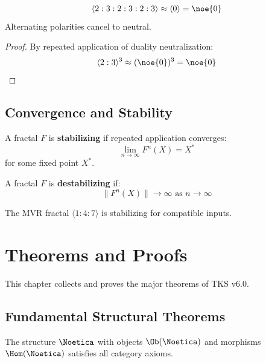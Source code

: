 \begin{theorem}
\label{thm:polarity-collapse}
\[
\langle 2 : 3 : 2 : 3 : 2 : 3 \rangle \approx \langle 0 \rangle = \noe{0}
\]
Alternating polarities cancel to neutral.
\end{theorem}

\begin{proof}
By repeated application of duality neutralization:
\[
\langle 2 : 3 \rangle^3 \approx (\noe{0})^3 = \noe{0}
\]
\end{proof}

\section{Convergence and Stability}

\begin{definition}
\label{def:stab-fractal}
A fractal $F$ is \textbf{stabilizing} if repeated application converges:
\[
\lim_{n \to \infty} F^n(X) = X^*
\]
for some fixed point $X^*$.
\end{definition}

\begin{definition}
\label{def:destab-fractal}
A fractal $F$ is \textbf{destabilizing} if:
\[
\|F^n(X)\| \to \infty \text{ as } n \to \infty
\]
\end{definition}

\begin{theorem}
\label{thm:mvr-stab}
The MVR fractal $\langle 1 : 4 : 7 \rangle$ is stabilizing for compatible inputs.
\end{theorem}

\chapter{Theorems and Proofs}
\label{ch:theorems}

This chapter collects and proves the major theorems of TKS v6.0.

\section{Fundamental Structural Theorems}

\begin{theorem}
\label{thm:noetica-cat-formal}
The structure $\Noetica$ with objects $\Ob(\Noetica)$ and morphisms $\Hom(\Noetica)$ satisfies all category axioms.
\end{theorem}


